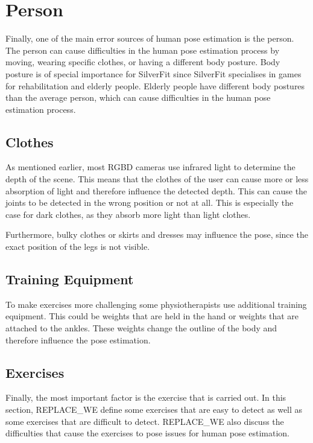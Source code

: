 \section{Person}

Finally, one of the main error sources of human pose estimation is the person. The person can cause difficulties in the human pose estimation process by moving, wearing specific clothes, or having a different body posture. Body posture is of special importance for SilverFit since SilverFit specialises in games for rehabilitation and elderly people. Elderly people have different body postures than the average person, which can cause difficulties in the human pose estimation process.

\subsection{Clothes}

As mentioned earlier, most RGBD cameras use infrared light to determine the depth of the scene. This means that the clothes of the user can cause more or less absorption of light and therefore influence the detected depth. This can cause the joints to be detected in the wrong position or not at all. This is especially the case for dark clothes, as they absorb more light than light clothes.

Furthermore, bulky clothes or skirts and dresses may influence the pose, since the exact position of the legs is not visible.

\subsection{Training Equipment}

To make exercises more challenging some physiotherapists use additional training equipment. This could be weights that are held in the hand or weights that are attached to the ankles. These weights change the outline of the body and therefore influence the pose estimation. 

\subsection{Exercises}
\label{sec:exercises}

Finally, the most important factor is the exercise that is carried out. In this section, REPLACE_WE define some exercises that are easy to detect as well as some exercises that are difficult to detect. REPLACE_WE also discuss the difficulties that cause the exercises to pose issues for human pose estimation.

